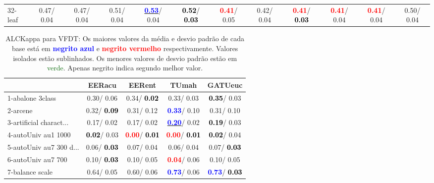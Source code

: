 \begin{table}[h]
\begin{center}
{\begin{tabular}{lc|c|c|c|c|c|c|c|c|c|c}
32-leaf &   0.47/  0.04 &   0.47/  0.04 &   0.51/  0.04 & \underline{\textcolor{blue}{\textbf{  0.53}}}/  0.04 & \textcolor{black}{\textbf{  0.52}}/\textcolor{black}{\textbf{  0.03}} & \textcolor{red}{\textbf{  0.41}}/  0.05 &   0.42/  0.04 & \textcolor{red}{\textbf{  0.41}}/\textcolor{black}{\textbf{  0.03}} & \textcolor{red}{\textbf{  0.41}}/  0.04 & \textcolor{red}{\textbf{  0.41}}/  0.04 &   0.50/  0.04 \\\end{tabular}}\label{stratsALCKappa0aVFDTRedux}
\end{center}
\end{table}
\begin{table}[h]
\caption{ALCKappa para VFDT: Os maiores valores da média e desvio padrão de cada base está em \textcolor{blue}{\textbf{negrito azul}} e \textcolor{red}{\textbf{negrito vermelho}} respectivamente. Valores isolados estão sublinhados. Os menores valores de desvio padrão estão em \textcolor{darkgreen}{verde}. Apenas negrito indica segundo melhor valor.}
\begin{center}\begin{tabular}{lc|c|c|c}
 & EERacu & EERent & TUmah & \textbf{GATUeuc}\\ \hline 1-abalone 3class &   0.30/  0.06 &   0.34/\textcolor{black}{\textbf{  0.02}} &   0.33/  0.03 & \textcolor{black}{\textbf{  0.35}}/  0.03 \\
2-arcene &   0.32/\textcolor{black}{\textbf{  0.09}} &   0.31/  0.12 & \textcolor{blue}{\textbf{  0.33}}/  0.10 &   0.31/  0.10 \\
3-artificial charact... &   0.17/  0.02 &   0.17/  0.02 & \underline{\textcolor{blue}{\textbf{  0.20}}}/  0.02 & \textcolor{black}{\textbf{  0.19}}/  0.03 \\
4-autoUniv au1 1000 & \textcolor{black}{\textbf{  0.02}}/  0.03 & \textcolor{red}{\textbf{  0.00}}/\textcolor{black}{\textbf{  0.01}} & \textcolor{red}{\textbf{  0.00}}/\textcolor{black}{\textbf{  0.01}} & \textcolor{black}{\textbf{  0.02}}/  0.04 \\
5-autoUniv au7 300 d... &   0.06/\textcolor{black}{\textbf{  0.03}} &   0.07/  0.04 &   0.06/  0.04 &   0.07/\textcolor{black}{\textbf{  0.03}} \\
6-autoUniv au7 700 &   0.10/\textcolor{black}{\textbf{  0.03}} &   0.10/  0.05 & \textcolor{red}{\textbf{  0.04}}/  0.06 &   0.10/  0.05 \\
7-balance scale &   0.64/  0.05 &   0.60/  0.06 & \textcolor{blue}{\textbf{  0.73}}/  0.06 & \textcolor{blue}{\textbf{  0.73}}/\textcolor{black}{\textbf{  0.03}} \\ \hline

\end{tabular}
\end{center}
\end{table}
